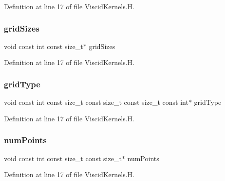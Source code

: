 Definition at line 17 of file Viscid\+Kernels.\+H.

\hypertarget{ViscidKernels_8H_a969a5d6106eec8b7096250b27865b9ba}{}\label{ViscidKernels_8H_a969a5d6106eec8b7096250b27865b9ba} 
\subsubsection{\texorpdfstring{grid\+Sizes}{gridSizes}}
{\footnotesize\ttfamily void const int const size\+\_\+t$\ast$ grid\+Sizes}



Definition at line 17 of file Viscid\+Kernels.\+H.

\hypertarget{ViscidKernels_8H_a7a50f58330cd920f95a842271848006b}{}\label{ViscidKernels_8H_a7a50f58330cd920f95a842271848006b} 
\subsubsection{\texorpdfstring{grid\+Type}{gridType}}
{\footnotesize\ttfamily void const int const size\+\_\+t const size\+\_\+t const size\+\_\+t const int$\ast$ grid\+Type}



Definition at line 17 of file Viscid\+Kernels.\+H.

\hypertarget{ViscidKernels_8H_adf0bf75d0875d1bb42a5348bee7b7bfd}{}\label{ViscidKernels_8H_adf0bf75d0875d1bb42a5348bee7b7bfd} 
\subsubsection{\texorpdfstring{num\+Points}{numPoints}}
{\footnotesize\ttfamily void const int const size\+\_\+t const size\+\_\+t$\ast$ num\+Points}



Definition at line 17 of file Viscid\+Kernels.\+H.

\hypertarget{ViscidKernels_8H_afdddc7f5e59ff0ec8fb420fa2c1091ef}{}\label{ViscidKernels_8H_afdddc7f5e59ff0ec8fb420fa2c1091ef} 
